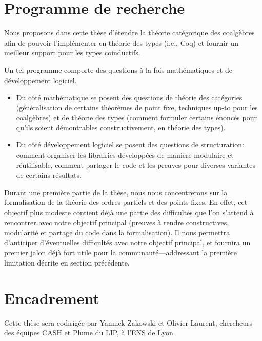 \documentclass[a4paper,11pt]{article}
\begin{document}
\section{Programme de recherche}

Nous proposons dans cette thèse d'étendre la théorie catégorique des coalgèbres afin de pouvoir l'implémenter en théorie des types (i.e., Coq) et fournir un meilleur support pour les types coinductifs.

Un tel programme comporte des questions à la fois mathématiques et de développement logiciel.
\begin{itemize}
\item Du côté mathématique se posent des questions de théorie des catégories (généralisation de certains théorèmes de point fixe, techniques up-to pour les coalgèbres) et de théorie des types (comment formuler certains énoncés pour qu'ils soient démontrables constructivement, en théorie des types).
\item Du côté développement logiciel se posent des questions de structuration: comment organiser les librairies développées de manière modulaire et réutilisable, comment partager le code et les preuves pour diverses variantes de certains résultats. 
\end{itemize}

Durant une première partie de la thèse, nous nous concentrerons sur la
formalisation de la théorie des ordres partiels et des points fixes. En effet,
cet objectif plus modeste contient déjà une partie des difficultés que l'on
s'attend à rencontrer avec notre objectif principal (preuves à rendre
constructives, modularité et partage du code dans la formalisation). Il nous
permettra d'anticiper d'éventuelles difficultés avec notre objectif principal,
et fournira un premier jalon déjà fort utile pour la communauté---addressant la
première limitation décrite en section précédente.

\section{Encadrement}

Cette thèse sera codirigée par Yannick Zakowski et Olivier Laurent, chercheurs des équipes CASH et Plume du LIP, à l'ENS de Lyon.



\end{document}
